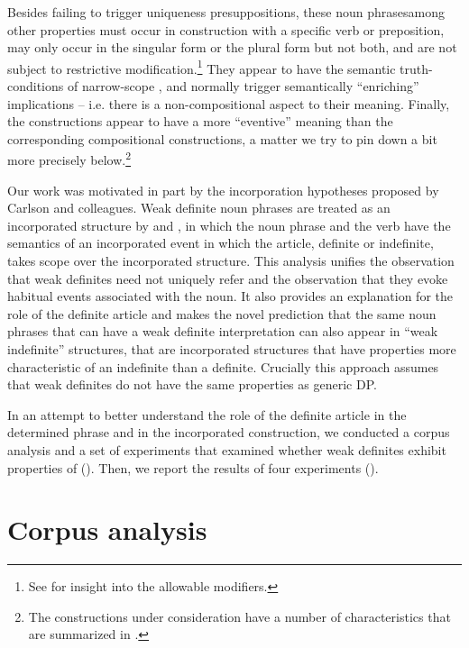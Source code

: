 \documentclass[output=paper,
modfonts
]{langscibook}
\begin{document}
Besides failing to trigger uniqueness presuppositions, these noun phrases\linebreak among other properties must occur in construction with a specific verb or preposition, may only occur in the singular form or the plural form but not both, and are not subject to restrictive modification.\footnote{See \citet{Aguilar-Guevara2014} for insight into the allowable modifiers.} They appear to have the semantic truth-conditions of narrow-scope , and normally trigger semantically “enriching” implications -- i.e. there is a non-compositional aspect to their meaning. Finally, the constructions appear to have a more “eventive” meaning than the corresponding compositional constructions, a matter we try to pin down a bit more precisely below.\footnote{ The constructions under consideration have a number of characteristics that are summarized in \citet{CarlsonEtAlii2006}.}

Our work was motivated in part by the incorporation hypotheses proposed by Carlson and colleagues. Weak definite noun phrases are treated as an incorporated structure by \citet{CarlsonEtAlii2013} and \citet{KleinEtAlii2013}, in which the noun phrase and the verb have the semantics of an incorporated event in which the article, definite or indefinite, takes scope over the incorporated structure. This analysis unifies the observation that weak definites need not uniquely refer and the observation that they evoke habitual events associated with the noun. It also provides an explanation for the role of the definite article and makes the novel prediction that the same noun phrases that can have a weak definite interpretation can also appear in “weak indefinite” structures, that are incorporated structures that have properties more characteristic of an indefinite than a definite. Crucially this approach assumes that weak definites do not have the same properties as generic DP.

In an attempt to better understand the role of the definite article in the determined phrase and in the incorporated construction, we conducted a corpus analysis and a set of experiments that examined whether weak definites exhibit properties of  (). Then, we report the results of four experiments ().

\section{Corpus analysis} \label{seC:desaetal:3}
\end{document}
